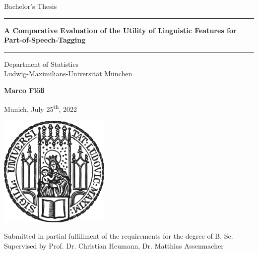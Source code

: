 \documentclass[12pt]{article}
\newcommand{\mytitle}{A Comparative Evaluation of the Utility of Linguistic Features for Part-of-Speech-Tagging}
\newcommand{\myname}{Marco Flöß}
\newcommand{\mysupervisor}{Prof. Dr. Christian Heumann, Dr. Matthias Assenmacher}
\begin{document}
 
\begin{titlepage}
\begin{center}
    
\LARGE
Bachelor's Thesis
    
\vspace{0.5cm}
      
\rule{\textwidth}{1.5pt}
\LARGE
\textbf{\mytitle}
\rule{\textwidth}{1.5pt}
   
\vspace{0.5cm}
      
\large
Department of Statistics \\
Ludwig-Maximilians-Universität München 

\vfill

\Large
\textbf{\myname}

\vfill

\large
Munich, July 25\textsuperscript{th}, 2022
      
\vfill

\includegraphics[width = 0.4\textwidth]{Pictures/sigillum.png}

\vfill

\normalsize
Submitted in partial fulfillment of the requirements for the degree of B. Sc.
\\

Supervised by \mysupervisor

\end{center}
\end{titlepage}


\newpage
\end{document}
